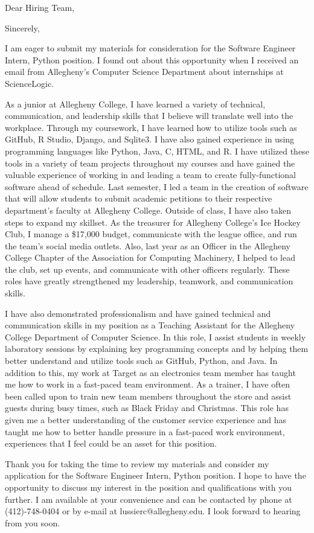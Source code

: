 \documentclass[11pt,a4paper,sans]{moderncv}        %
\begin{document}
\date{January 30, 2020}
\opening{Dear Hiring Team,}
\closing{Sincerely,}

\makelettertitle

I am eager to submit my materials for consideration for the Software Engineer Intern, Python position. I found out about this opportunity when I received an email from Allegheny's Computer Science Department about internships at ScienceLogic.

As a junior at Allegheny College, I have learned a variety of technical, communication, and leadership skills that I believe will translate well into the workplace. Through my coursework, I have learned how to utilize tools such as GitHub, R Studio, Django, and Sqlite3. I have also gained experience in using programming languages like Python, Java, C, HTML, and R. I have utilized these tools in a variety of team projects throughout my courses and have gained the valuable experience of working in and leading a team to create fully-functional software ahead of schedule. Last semester, I led a team in the creation of software that will allow students to submit academic petitions to their respective department's faculty at Allegheny College. Outside of class, I have also taken steps to expand my skillset. As the treasurer for Allegheny College’s Ice Hockey Club, I manage a \$17,000 budget, communicate with the league office, and run the team's social media outlets. Also, last year as an Officer in the Allegheny College Chapter of the Association for Computing Machinery, I helped to lead the club, set up events, and communicate with other officers regularly. These roles have greatly strengthened my leadership, teamwork, and communication skills.

I have also demonstrated professionalism and have gained technical and communication skills in my position as a Teaching Assistant for the Allegheny College Department of Computer Science. In this role, I assist students in weekly laboratory sessions by explaining key programming concepts and by helping them better understand and utilize tools such as GitHub, Python, and Java. In addition to this, my work at Target as an electronics team member has taught me how to work in a fast-paced team environment. As a trainer, I have often been called upon to train new team members throughout the store and assist guests during busy times, such as Black Friday and Christmas. This role has given me a better understanding of the customer service experience and has taught me how to better handle pressure in a fast-paced work environment, experiences that I feel could be an asset for this position.

Thank you for taking the time to review my materials and consider my application for the Software Engineer Intern, Python position. I hope to have the opportunity to discuss my interest in the position and qualifications with you further. I am available at your convenience and can be contacted by phone at (412)-748-0404 or by e-mail at lussierc@allegheny.edu. I look forward to hearing from you soon.

\bigbreak
\makeletterclosing
\end{document}
